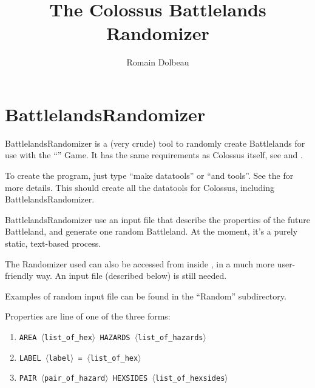 \documentclass{article}
\begin{document}

\title{The Colossus Battlelands Randomizer}

\author{Romain Dolbeau}

\maketitle

\section{BattlelandsRandomizer}

BattlelandsRandomizer is a (very crude) tool to randomly
create Battlelands for use with the
``'' Game.
It has the same requirements as Colossus itself, see
and
.

To create the program, just type ``make datatools'' or ``and tools''.
See the
for more details.
This should create all the datatools for Colossus, including
BattlelandsRandomizer.

BattlelandsRandomizer use an input file that describe
the properties of the future Battleland, and generate
one random Battleland. At the moment, it's a purely
static, text-based process.

The Randomizer used can also be accessed from inside
,
in a much more user-friendly way. An input file (described below) is
still needed.

Examples of random input file can be found in the
``Random'' subdirectory.

Properties are line of one of the three forms:

\begin{enumerate}

\item \texttt{AREA $\langle$list\_of\_hex$\rangle$ HAZARDS $\langle$list\_of\_hazards$\rangle$}
\item \texttt{LABEL $\langle$label$\rangle$ = $\langle$list\_of\_hex$\rangle$}
\item \texttt{PAIR $\langle$pair\_of\_hazard$\rangle$ HEXSIDES $\langle$list\_of\_hexsides$\rangle$}

\end{enumerate}
\end{document}
